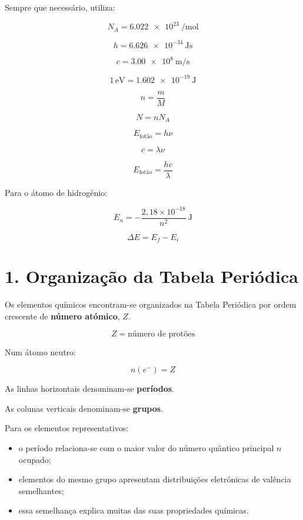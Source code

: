 \documentclass[11pt,a4paper]{article}
\begin{document}
	\begin{dados}
		
		Sempre que necessário, utiliza:
		
		\[
		N_A=\SI{6.022e23}{\per\mole}
		\]
		
		\[
		h=\SI{6.626e-34}{\joule\second}
		\]
		
		\[
		c=\SI{3.00e8}{\meter\per\second}
		\]
		
		\[
		1\,\mathrm{eV}
		=
		\SI{1.602e-19}{\joule}
		\]
		
		\[
		n=\frac{m}{M}
		\]
		
		\[
		N=nN_A
		\]
		
		\[
		E_{\text{fotão}}=h\nu
		\]
		
		\[
		c=\lambda\nu
		\]
		
		\[
		E_{\text{fotão}}
		=
		\frac{hc}{\lambda}
		\]
		
		Para o átomo de hidrogénio:
		
		\[
		\boxed{
			E_n=
			-\frac{2,18\times10^{-18}}{n^2}
			\ \mathrm{J}
		}
		\]
		
		\[
		\Delta E=E_f-E_i
		\]
		
	\end{dados}
	
	
	\section*{\textcolor{eublue}{1. Organização da Tabela Periódica}}
	
	\begin{recorda}
		
		Os elementos químicos encontram-se organizados na Tabela Periódica
		por ordem crescente de \textbf{número atómico}, \(Z\).
		
		\[
		\boxed{
			Z=\text{número de protões}
		}
		\]
		
		Num átomo neutro:
		
		\[
		\boxed{
			n(e^-)=Z
		}
		\]
		
		As linhas horizontais denominam-se \textbf{períodos}.
		
		As colunas verticais denominam-se \textbf{grupos}.
		
		Para os elementos representativos:
		
		\begin{itemize}
			
			\item o período relaciona-se com o maior valor do número quântico
			principal \(n\) ocupado;
			
			\item elementos do mesmo grupo apresentam distribuições eletrónicas
			de valência semelhantes;
			
			\item essa semelhança explica muitas das suas propriedades químicas.
			
		\end{itemize}
		
	\end{recorda}
	
\end{document}
